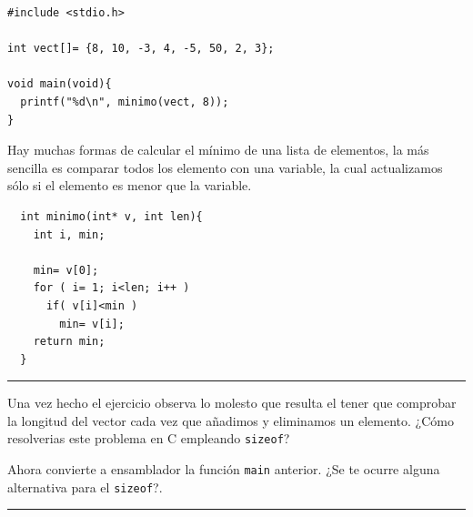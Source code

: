 \begin{lstlisting}
#include <stdio.h>

int vect[]= {8, 10, -3, 4, -5, 50, 2, 3};

void main(void){
  printf("%d\n", minimo(vect, 8));
}
\end{lstlisting}

Hay muchas formas de calcular el mínimo de una lista de elementos, la más sencilla es
comparar todos los elemento con una variable, la cual actualizamos sólo si el elemento es
menor que la variable.

\begin{center}
\begin{myfbox}
\small
\begin{minipage}{0.92\linewidth}
\begin{center}
\begin{minipage}{0.6\linewidth}
\begin{verbatim}
  int minimo(int* v, int len){
    int i, min;

    min= v[0];
    for ( i= 1; i<len; i++ )
      if( v[i]<min )
        min= v[i];
    return min;
  }
\end{verbatim}
\end{minipage}
\end{center}
\begin{center}
\colorbox[gray]{1}{\rule{0cm}{7cm}\rule{11cm}{0cm}}
\end{center}
\end{minipage}
\end{myfbox}
\end{center}

Una vez hecho el ejercicio observa lo molesto que resulta el tener que
comprobar la longitud del vector cada vez que añadimos y eliminamos un
elemento. ¿Cómo resolverias este problema en C empleando {\tt sizeof}?

Ahora convierte a ensamblador la función {\tt main} anterior. ¿Se te
ocurre alguna alternativa para el {\tt sizeof}?.

\begin{center}
\begin{myfbox}
\small
\begin{minipage}{0.92\linewidth}
\begin{center}
\colorbox[gray]{1}{\rule{0cm}{4.5cm}\rule{11cm}{0cm}}
\end{center}
\end{minipage}
\end{myfbox}
\end{center}

